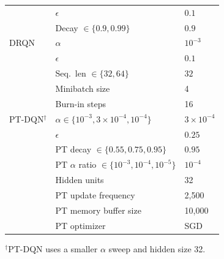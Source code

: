 \begin{table}[H]
\begin{center}
\begin{tabular}{lll}
                                 & $\epsilon$     & $0.1$ \\
                                 & Decay $\in \{0.9, 0.99\}$   & $0.9$ \\[4pt]
            DRQN                 & $\alpha$       & $10^{-3}$ \\
                                 & $\epsilon$     & $0.1$ \\
                                 & Seq.\ len $\in \{32, 64\}$  & $32$ \\
                                 & Minibatch size & 4 \\
                                 & Burn-in steps  & 16 \\[4pt]
            PT-DQN$^\dagger$     & $\alpha \in \{10^{-3}, 3\times10^{-4}, 10^{-4}\}$     & $3 \times 10^{-4}$ \\
                                 & $\epsilon$                                              & $0.25$ \\
                                 & PT decay $\in \{0.55, 0.75, 0.95\}$                   & $0.95$ \\
                                 & PT $\alpha$ ratio $\in \{10^{-3}, 10^{-4}, 10^{-5}\}$ & $10^{-4}$ \\
                                 & Hidden units   & 32 \\
                                 & PT update frequency & 2{,}500 \\
                                 & PT memory buffer size & 10{,}000 \\
                                 & PT optimizer   & SGD \\
        \end{tabular}
    \end{center}
    {\small $^\dagger$PT-DQN uses a smaller $\alpha$ sweep and hidden size 32.}
    \label{tab:dqn_swept_hypers}
\end{table}

